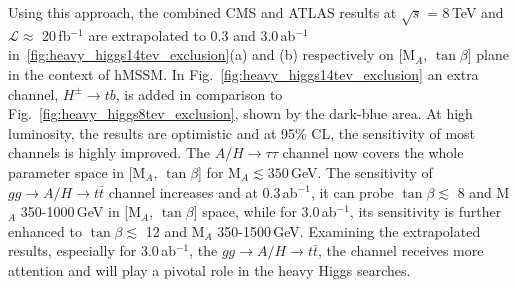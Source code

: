 Using this approach, the combined CMS and ATLAS results at $\sqrt{s}$ = 8\,TeV and $\mathcal{L}\approx$ 20\,fb$^{-1}$ are extrapolated to 0.3 and 3.0\,ab$^{-1}$ in~\ref{fig:heavy_higgs14tev_exclusion}(a) and (b) respectively on [M$_{A}$, $\tan\beta$] plane in the context of hMSSM. In Fig.~\ref{fig:heavy_higgs14tev_exclusion} an extra channel, $H^{\pm}\rightarrow tb$, is added in comparison to Fig.~\ref{fig:heavy_higgs8tev_exclusion}, shown by the dark-blue area. At high luminosity, the results are optimistic and at 95\% CL, the sensitivity of most channels is highly improved. The $A/H\rightarrow \tau\tau$ channel now covers the whole parameter space in [M$_{A}$, $\tan\beta$] for M$_{A}\lesssim 350$\,GeV. The sensitivity of $gg\rightarrow A/H \rightarrow t\bar t$ channel increases and at 0.3\,ab$^{-1}$, it can probe $\tan\beta \lesssim$ 8 and M$_{A}$ 350-1000\,GeV in [M$_{A}$, $\tan\beta$] space, while for 3.0\,ab$^{-1}$, its sensitivity is further enhanced to $\tan\beta \lesssim$ 12 and M$_{A}$ 350-1500\,GeV. Examining the extrapolated results, especially for 3.0\,ab$^{-1}$, the $gg\rightarrow A/H\rightarrow t\bar t$, the channel receives more attention and will play a pivotal role in the heavy Higgs searches. 
